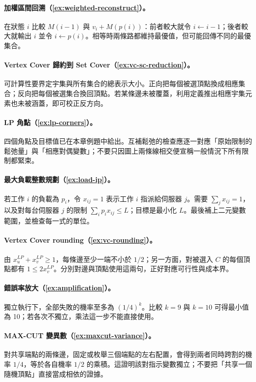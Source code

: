 \documentclass[11pt,a4paper,oneside,openany]{book}
\begin{document}
\paragraph{加權區間回溯（\cref{ex:weighted-reconstruct}）。}
在狀態 $i$ 比較 $M(i-1)$ 與 $v_i+M(p(i))$：前者較大就令 $i\leftarrow i-1$；後者較大就輸出 $i$ 並令 $i\leftarrow p(i)$。相等時兩條路都維持最優值，但可能回傳不同的最優集合。

\paragraph{Vertex Cover 歸約到 Set Cover（\cref{ex:vc-sc-reduction}）。}
可計算性要界定宇集與所有集合的總表示大小。正向把每個被選頂點換成相應集合；反向把每個被選集合換回頂點。若某條邊未被覆蓋，利用定義推出相應宇集元素也未被涵蓋，即可校正反方向。

\paragraph{LP 角點（\cref{ex:lp-corners}）。}
四個角點及目標值已在本章例題中給出。互補鬆弛的檢查應逐一對應「原始限制的鬆弛量」與「相應對偶變數」；不要只因圖上兩條線相交便宣稱一般情況下所有限制都緊束。

\paragraph{最大負載整數規劃（\cref{ex:load-ip}）。}
若工作 $i$ 的負載為 $p_i$，令 $x_{ij}=1$ 表示工作 $i$ 指派給伺服器 $j$。需要 $\sum_jx_{ij}=1$，以及對每台伺服器 $j$ 的限制 $\sum_i p_i x_{ij}\le L$；目標是最小化 $L$。最後補上二元變數範圍，並檢查每一式的單位。

\paragraph{Vertex Cover rounding（\cref{ex:vc-rounding}）。}
由 $x_u^{LP}+x_v^{LP}\ge1$，每條邊至少一端不小於 $1/2$；另一方面，對被選入 $C$ 的每個頂點都有 $1\le2x_v^{LP}$。分別對邊與頂點使用這兩句，正好對應可行性與成本界。

\paragraph{錯誤率放大（\cref{ex:amplification}）。}
獨立執行下，全部失敗的機率至多為 $(1/4)^k$。比較 $k=9$ 與 $k=10$ 可得最小值為 10；若各次不獨立，乘法這一步不能直接使用。

\paragraph{MAX-CUT 變異數（\cref{ex:maxcut-variance}）。}
對共享端點的兩條邊，固定或枚舉三個端點的左右配置，會得到兩者同時跨割的機率 $1/4$，等於各自機率 $1/2$ 的乘積。這證明該對指示變數獨立；不要把「共享一個隨機頂點」直接當成相依的證據。
\end{document}
